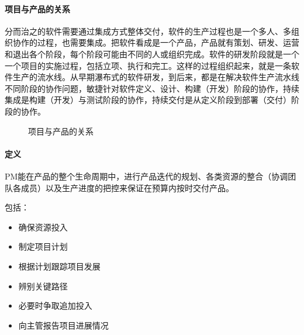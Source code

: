 \documentclass[letterpaper,10pt,english]{sphinxmanual}
\begin{document}
\paragraph{项目与产品的关系}
\label{\detokenize{chapter_knowledge/project_manage:id2}}
分而治之的软件需要通过集成方式整体交付，软件的生产过程也是一个多人、多组织协作的过程，也需要集成。把软件看成是一个产品，产品就有策划、研发、运营和退出各个阶段，每个阶段可能由不同的人或组织完成。软件的研发阶段就是一个一个项目的实施过程，包括立项、执行和完工。这样的过程组织起来，就是一条软件生产的流水线。从早期瀑布式的软件研发，到后来，都是在解决软件生产流水线不同阶段的协作问题，敏捷针对软件定义、设计、构建（开发）阶段的协作，持续集成是构建（开发）与测试阶段的协作，持续交付是从定义阶段到部署（交付）阶段的协作。

\begin{figure}[H]
\centering
\capstart

\noindent{}
\caption{项目与产品的关系\sphinxfootnotemark[643]}\label{\detokenize{chapter_knowledge/project_manage:id18}}\end{figure}
%
\begin{footnotetext}[643]\sphinxAtStartFootnote
{}
%
\end{footnotetext}\ignorespaces 

\paragraph{定义}
\label{\detokenize{chapter_knowledge/project_manage:id3}}
PM能在产品的整个生命周期中，进行产品迭代的规划、各类资源的整合（协调团队各成员）以及生产进度的把控来保证在预算内按时交付产品。
%
\begin{footnote}[644]\sphinxAtStartFootnote
{}
%
\end{footnote}

包括：
\begin{itemize}
\item {} 
确保资源投入

\item {} 
制定项目计划

\item {} 
根据计划跟踪项目发展

\item {} 
辨别关键路径

\item {} 
必要时争取追加投入

\item {} 
向主管报告项目进展情况%
\begin{footnote}[645]\sphinxAtStartFootnote
{}
%
\end{footnote}

\end{itemize}
\end{document}
